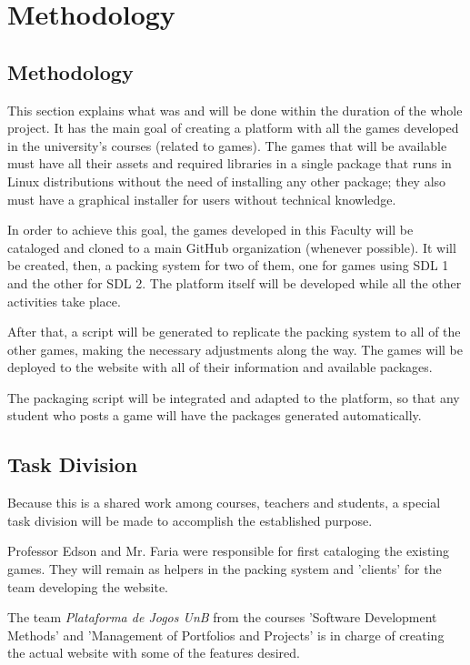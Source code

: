 \chapter[Methodology]{Methodology}
\section[Methodology]{Methodology}

This section explains what was and will be done within the duration of the
whole project. It has the main goal of creating a platform with all the games
developed in the university's courses (related to games). The games that will
be available must have all their assets and required libraries in a single
package that runs in Linux distributions without the need of installing any other package;
they also must have a graphical installer for users without technical
knowledge.

In order to achieve this goal, the games developed in this Faculty will be cataloged and cloned to a main GitHub organization (whenever possible).
It will be created, then, a packing system for two of them, one for games
using SDL 1 and the other for SDL 2. The platform itself will be developed while all the other activities take place.

After that, a script will be generated to replicate the packing system to all
of the other games, making the necessary adjustments along the way. The games
will be deployed to the website with all of their information and available
packages.

The packaging script will be integrated and adapted to the platform, so that any student who posts a game will have the packages generated automatically.

\section[Task Division]{Task Division}

Because this is a shared work among courses, teachers and students, a special
task division will be made to accomplish the established purpose.

Professor Edson and Mr. Faria were responsible for first cataloging the existing games. They will remain as helpers in the packing system and 'clients'
for the team developing the website.

The team \textit{Plataforma de Jogos UnB} from the courses 'Software
Development Methods' and 'Management of Portfolios and Projects' is
in charge of creating the actual website with some of the features desired.

